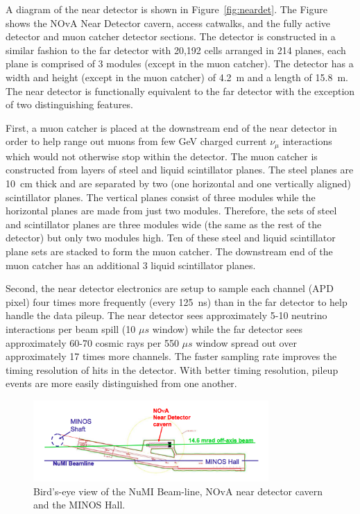 A diagram of the near detector is shown in
Figure~\ref{fig:neardet}. The Figure shows the NOvA Near Detector
cavern, access catwalks, and the fully active detector and muon catcher
detector sections.
The detector is constructed in a similar fashion to the far detector
with 20,192 cells arranged in 214 planes, each plane is comprised of 3
modules (except in the muon catcher). The detector has a width and
height (except in the muon catcher) of 4.2~m and a length of
15.8~m. The near detector is
functionally equivalent to the far detector with the exception of two
distinguishing features.

First, a muon catcher is placed at the downstream end of the near
detector in order to help range out muons
from few GeV charged current $\nu_{\mu}$ interactions which would not
otherwise stop within the detector.
The muon catcher is constructed from layers of steel and liquid
scintillator planes. The steel planes are 10~cm
thick and are separated by 
two (one horizontal and one vertically aligned) scintillator planes.
The vertical planes consist of
three modules while the horizontal planes are made from just two
modules. Therefore, the sets of steel and scintillator planes are
three modules wide (the same as the rest of the detector) but only
two modules high. Ten of these steel and
liquid scintillator plane sets are stacked to form the muon
catcher. The downstream end of the muon catcher has an additional 3
liquid scintillator planes.

Second, the near detector electronics are setup to sample each channel
(APD pixel)
four times more frequently (every 125~ns) than in the far 
detector to help handle the data pileup. 
The near detector sees approximately 5-10 neutrino interactions per
beam spill (10 $\mu s$ window) while the far detector sees
approximately 60-70 cosmic rays per 550 $\mu s$ window spread out over
approximately 17 times more channels. The faster sampling rate
improves the timing resolution of hits in the detector. With better
timing resolution, pileup events are more easily distinguished from one
another. 




\begin{figure}
  \centering
  \includegraphics[width=0.8\textwidth]{../../img/baird/det/neardet_cavern_diagram.png}
  \caption{Bird's-eye view of the NuMI Beam-line, NOvA near detector cavern
    and the MINOS Hall. }
  \label{fig:cavern}
\end{figure}

